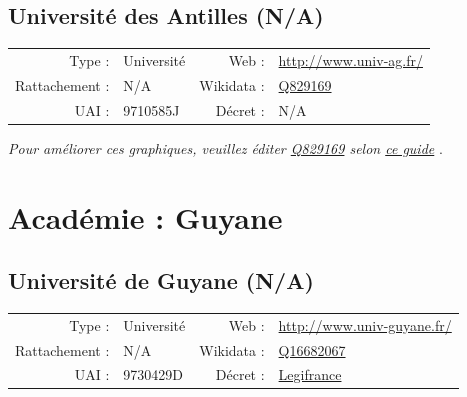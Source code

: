 \documentclass[12pt,french,landscape]{article}
\begin{document}
\hypertarget{universituxe9-des-antilles-na}{%
\subsection{Université des Antilles
(N/A)}\label{universituxe9-des-antilles-na}}

\begin{tabular*}{0.45\textwidth}{rp{2cm}rl}  
\hline  
Type : & Université & Web : &\href{http://www.univ-ag.fr/}{http://www.univ-ag.fr/} \\  
Rattachement : & N/A & Wikidata : & \href{https://www.wikidata.org/entity/Q829169}{Q829169} \\  
UAI : & 9710585J & Décret : & N/A \\  
\hline  
\end{tabular*}

\textit{\scriptsize Pour améliorer ces graphiques, veuillez éditer \href{https://www.wikidata.org/entity/Q829169}{Q829169}  selon \href{https://github.com/cpesr/wikidataESR/blob/master/Rmd/wikidataESR.md}{ce guide}}
.


\newpage

\hypertarget{acaduxe9mie-guyane}{%
\section{Académie : Guyane}\label{acaduxe9mie-guyane}}

\hypertarget{universituxe9-de-guyane-na}{%
\subsection{Université de Guyane
(N/A)}\label{universituxe9-de-guyane-na}}

\begin{tabular*}{0.45\textwidth}{rp{2cm}rl}  
\hline  
Type : & Université & Web : &\href{http://www.univ-guyane.fr/}{http://www.univ-guyane.fr/} \\  
Rattachement : & N/A & Wikidata : & \href{https://www.wikidata.org/entity/Q16682067}{Q16682067} \\  
UAI : & 9730429D & Décret : & \href{http://www.legifrance.gouv.fr/affichTexte.do;jsessionid=?cidTexte=JORFTEXT000029310823&dateTexte=&oldAction=dernierJO&categorieLien=id}{Legifrance} \\  
\hline  
\end{tabular*}
\end{document}
